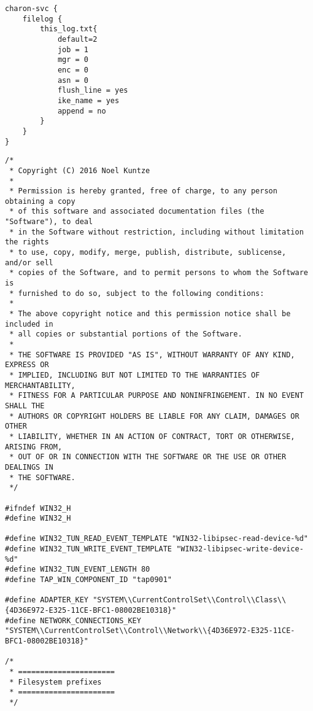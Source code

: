 \begin{lstlisting}[caption=Testkonfiguration - strongswan.conf,label=lst:strongswan.conf]
charon-svc {
	filelog {
		this_log.txt{
			default=2
			job = 1
			mgr = 0
			enc = 0 
			asn = 0
			flush_line = yes
			ike_name = yes
			append = no
		}
	}
}
\end{lstlisting}

\begin{lstlisting}[caption=Code von win32.h,label=lst:libstrongswan-win32.h]
/*
 * Copyright (C) 2016 Noel Kuntze
 *
 * Permission is hereby granted, free of charge, to any person obtaining a copy
 * of this software and associated documentation files (the "Software"), to deal
 * in the Software without restriction, including without limitation the rights
 * to use, copy, modify, merge, publish, distribute, sublicense, and/or sell
 * copies of the Software, and to permit persons to whom the Software is
 * furnished to do so, subject to the following conditions:
 *
 * The above copyright notice and this permission notice shall be included in
 * all copies or substantial portions of the Software.
 *
 * THE SOFTWARE IS PROVIDED "AS IS", WITHOUT WARRANTY OF ANY KIND, EXPRESS OR
 * IMPLIED, INCLUDING BUT NOT LIMITED TO THE WARRANTIES OF MERCHANTABILITY,
 * FITNESS FOR A PARTICULAR PURPOSE AND NONINFRINGEMENT. IN NO EVENT SHALL THE
 * AUTHORS OR COPYRIGHT HOLDERS BE LIABLE FOR ANY CLAIM, DAMAGES OR OTHER
 * LIABILITY, WHETHER IN AN ACTION OF CONTRACT, TORT OR OTHERWISE, ARISING FROM,
 * OUT OF OR IN CONNECTION WITH THE SOFTWARE OR THE USE OR OTHER DEALINGS IN
 * THE SOFTWARE.
 */

#ifndef WIN32_H
#define WIN32_H

#define WIN32_TUN_READ_EVENT_TEMPLATE "WIN32-libipsec-read-device-%d"
#define WIN32_TUN_WRITE_EVENT_TEMPLATE "WIN32-libipsec-write-device-%d"
#define WIN32_TUN_EVENT_LENGTH 80
#define TAP_WIN_COMPONENT_ID "tap0901"

#define ADAPTER_KEY "SYSTEM\\CurrentControlSet\\Control\\Class\\{4D36E972-E325-11CE-BFC1-08002BE10318}"
#define NETWORK_CONNECTIONS_KEY "SYSTEM\\CurrentControlSet\\Control\\Network\\{4D36E972-E325-11CE-BFC1-08002BE10318}"

/*
 * ======================
 * Filesystem prefixes
 * ======================
 */


\end{lstlisting}
